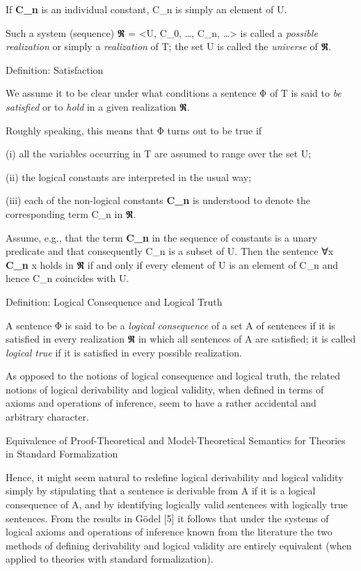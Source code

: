 If \textbf{C\_n} is an individual constant, C\_n is simply an element of
U.

Such a system (sequence) 𝕽 = \textless U, C\_0, \ldots, C\_n,
\ldots\textgreater{} is called a \emph{possible realization} or simply a
\emph{realization} of T; the set U is called the \emph{universe} of 𝕽.

\protect\hypertarget{anchor-17}{}{}Definition: Satisfaction

We assume it to be clear under what conditions a sentence Φ of T is said
to \emph{be satisfied} or to \emph{hold} in a given realization 𝕽.

Roughly speaking, this means that Φ turns out to be true if

(i) all the variables occurring in T are assumed to range over the set
U;

(ii) the logical constants are interpreted in the usual way;

(iii) each of the non-logical constants \textbf{C\_n} is understood to
denote the corresponding term C\_n in 𝕽.

Assume, e.g., that the term \textbf{C\_n} in the sequence of constants
is a unary predicate and that consequently C\_n is a subset of U. Then
the sentence ∀x \textbf{C\_n} x holds in 𝕽 if and only if every element
of U is an element of C\_n and hence C\_n coincides with U.

\protect\hypertarget{anchor-18}{}{}Definition: Logical Consequence and
Logical Truth

A sentence Φ is said to be a \emph{logical consequence} of a set A of
sentences if it is satisfied in every realization 𝕽 in which all
sentences of A are satisfied; it is called \emph{logical true} if it is
satisfied in every possible realization.

As opposed to the notions of logical consequence and logical truth, the
related notions of logical derivability and logical validity, when
defined in terms of axioms and operations of inference, seem to have a
rather accidental and arbitrary character.

\protect\hypertarget{anchor-19}{}{}Equivalence of Proof-Theoretical and
Model-Theoretical Semantics for Theories in Standard Formalization

Hence, it might seem natural to redefine logical derivability and
logical validity simply by stipulating that a sentence is derivable from
A if it is a logical consequence of A, and by identifying logically
valid sentences with logically true sentences. From the results in Gödel
{[}5{]} it follows that under the systems of logical axioms and
operations of inference known from the literature the two methods of
defining derivability and logical validity are entirely equivalent (when
applied to theories with standard formalization).


